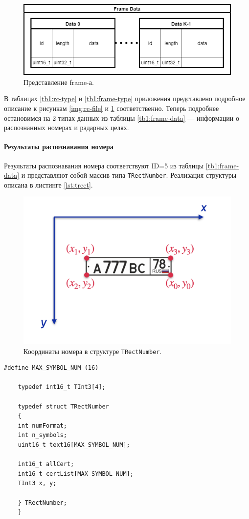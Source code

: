 \documentclass[specification,annotation,times]{itmo-student-thesis}
\begin{document}
	\begin{figure}[!ht]
		\caption{Представление frame-а.}\label{img:frame-data}
		\includegraphics[width=0.85\linewidth]{../png/frame_data.png}
		\centering
	\end{figure}
	
	В таблицах \ref{tb1:rc-type} и \ref{tb1:frame-type} приложения представлено подробное описание к рисункам \ref{img:rc-file} и \ref{img:frame-data} соответственно. Теперь подробнее остановимся на 2 типах данных из таблицы \ref{tb1:frame-data} --- информации о распознанных номерах и радарных целях.
	
	\paragraph{Результаты распознавания номера}
	Результаты распознавания номера соответствуют ID=5 из таблицы \ref{tb1:frame-data} и представляют собой массив типа \texttt{TRectNumber}. Реализация структуры описана в листинге \ref{lst:trect}.
	
	\begin{figure}[!ht]
		\caption{Координаты номера в структуре \texttt{TRectNumber}.}\label{img:licnum-recog-ind}
		\includegraphics[width=0.85\linewidth]{../png/licnum_recog_coords.png}
		\centering
	\end{figure}
	
	\begin{lstlisting}[float=!h,caption={Реализация структуры \texttt{TRectNumber}.},label={lst:trect}]
	#define	MAX_SYMBOL_NUM (16)
	
	typedef int16_t TInt3[4];
	
	typedef struct TRectNumber
	{
	int numFormat;
	int n_symbols;
	uint16_t text16[MAX_SYMBOL_NUM];
	
	int16_t allCert;
	int16_t certList[MAX_SYMBOL_NUM];
	TInt3 x, y;
	
	} TRectNumber;
	}
	\end{lstlisting}
	
\end{document}

